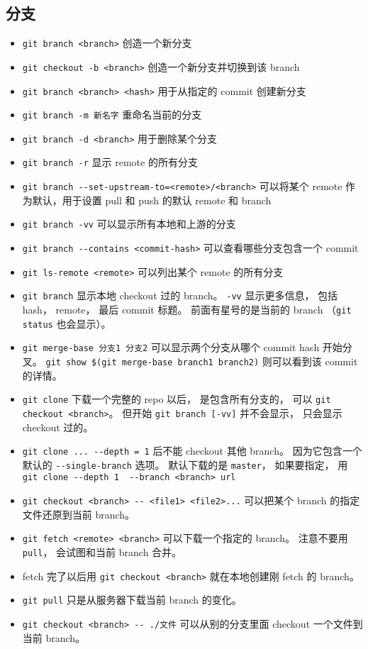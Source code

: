 \subsection{分支}
\begin{itemize}
\item \verb`git branch <branch>` 创造一个新分支
\item \verb`git checkout -b <branch>` 创造一个新分支并切换到该 branch
\item \verb`git branch <branch> <hash>` 用于从指定的 commit 创建新分支
\item \verb`git branch -m 新名字` 重命名当前的分支
\item \verb`git branch -d <branch>` 用于删除某个分支
\item \verb`git branch -r` 显示 remote 的所有分支
\item \verb`git branch --set-upstream-to=<remote>/<branch>` 可以将某个 remote 作为默认，用于设置 pull 和 push 的默认 remote 和 branch
\item \verb`git branch -vv` 可以显示所有本地和上游的分支
\item \verb`git branch --contains <commit-hash>` 可以查看哪些分支包含一个 commit
\item \verb`git ls-remote <remote>` 可以列出某个 remote 的所有分支
\item \verb`git branch` 显示本地 checkout 过的 branch。 \verb`-vv` 显示更多信息， 包括 hash， remote， 最后 commit 标题。 前面有星号的是当前的 branch （\verb`git status` 也会显示）。
\item \verb`git merge-base 分支1 分支2` 可以显示两个分支从哪个 commit hash 开始分叉。 \verb`git show $(git merge-base branch1 branch2)` 则可以看到该 commit 的详情。
\item \verb`git clone` 下载一个完整的 repo 以后， 是包含所有分支的， 可以 \verb`git checkout <branch>`。 但开始 \verb`git branch [-vv]` 并不会显示， 只会显示 checkout 过的。
\item \verb`git clone ... --depth = 1` 后不能 checkout 其他 branch。 因为它包含一个默认的 \verb`--single-branch` 选项。 默认下载的是 \verb`master`， 如果要指定， 用 \verb`git clone --depth 1  --branch <branch> url`
\item \verb`git checkout <branch> -- <file1> <file2>...` 可以把某个 branch 的指定文件还原到当前 branch。
\item \verb`git fetch <remote> <branch>` 可以下载一个指定的 branch。 注意不要用 \verb`pull`， 会试图和当前 branch 合并。
\item fetch 完了以后用 \verb`git checkout <branch>` 就在本地创建刚 fetch 的 branch。
\item \verb`git pull` 只是从服务器下载当前 branch 的变化。
\item \verb`git checkout <branch> -- ./文件` 可以从别的分支里面 checkout 一个文件到当前 branch。


\end{itemize}
